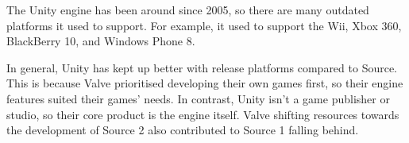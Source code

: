 \documentclass[a4paper, 12pt]{scrartcl}
\begin{document}
The Unity engine has been around since 2005, so there are many outdated platforms it used to support. For example, it used to support the Wii, Xbox 360, BlackBerry 10, and Windows Phone 8.

In general, Unity has kept up better with release platforms compared to Source. This is because Valve prioritised developing their own games first, so their engine features suited their games' needs. In contrast, Unity isn't a game publisher or studio, so their core product is the engine itself. Valve shifting resources towards the development of Source 2 also contributed to Source 1 falling behind.
\end{document}
